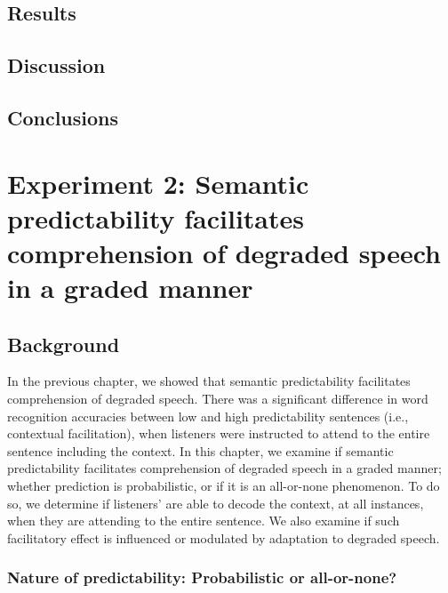 \documentclass[a4paper, nobind]{templates/ociamthesis}
\begin{document}
\hypertarget{results-1}{%
\section{Results}\label{results-1}}

\hypertarget{discussion}{%
\section{Discussion}\label{discussion}}

\hypertarget{conclusions}{%
\section{Conclusions}\label{conclusions}}

\hypertarget{experiment-2-semantic-predictability-facilitates-comprehension-of-degraded-speech-in-a-graded-manner}{%
\chapter{Experiment 2: Semantic predictability facilitates comprehension of degraded speech in a graded manner}\label{experiment-2-semantic-predictability-facilitates-comprehension-of-degraded-speech-in-a-graded-manner}}

\minitoc

\hypertarget{background}{%
\section{Background}\label{background}}

In the previous chapter, we showed that semantic predictability facilitates comprehension of degraded speech.
There was a significant difference in word recognition accuracies between low and high predictability sentences (i.e., contextual facilitation), when listeners were instructed to attend to the entire sentence including the context.
In this chapter, we examine if semantic predictability facilitates comprehension of degraded speech in a graded manner; whether prediction is probabilistic, or if it is an all-or-none phenomenon.
To do so, we determine if listeners' are able to decode the context, at all instances, when they are attending to the entire sentence.
We also examine if such facilitatory effect is influenced or modulated by adaptation to degraded speech.

\hypertarget{nature-of-predictability-probabilistic-or-all-or-none}{%
\subsection{Nature of predictability: Probabilistic or all-or-none?}\label{nature-of-predictability-probabilistic-or-all-or-none}}
\end{document}
